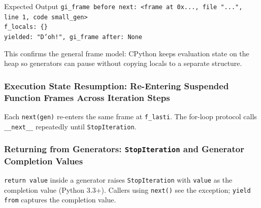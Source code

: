 \begin{iobox}{Expected Output}
\texttt{gi\_frame before next: <frame at 0x..., file "...", line 1, code small\_gen>} \\
\texttt{f\_locals: \{\}} \\
\texttt{yielded: "D'oh!", gi\_frame after: None} \\
\end{iobox}




This confirms the general frame model: CPython keeps evaluation state on the heap so generators can pause without copying locals to a separate structure.

\subsubsection{Execution State Resumption: Re-Entering Suspended Function Frames Across Iteration Steps}

Each \texttt{next(gen)} re-enters the same frame at \texttt{f\_lasti}. The for-loop protocol calls \texttt{\_\_next\_\_} repeatedly until \texttt{StopIteration}.

\subsubsection{Returning from Generators: \texttt{StopIteration} and Generator Completion Values}

\texttt{return value} inside a generator raises \texttt{StopIteration} with \texttt{value} as the completion value (Python 3.3+). Callers using \texttt{next()} see the exception; \texttt{yield from} captures the completion value.
